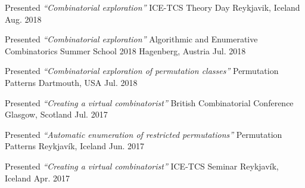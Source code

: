 


\begin{cventries}

\cventrypresentation
  {Presented \textit{``Combinatorial exploration''}} %
  {ICE-TCS Theory Day} %
  {Reykjavik, Iceland} %
  {Aug. 2018} %



\cventrypresentation
  {Presented \textit{``Combinatorial exploration''}} %
  {Algorithmic and Enumerative Combinatorics Summer School 2018} %
  {Hagenberg, Austria} %
  {Jul. 2018} %


\cventrypresentation
  {Presented \textit{``Combinatorial exploration of permutation classes''}} %
  {Permutation Patterns} %
  {Dartmouth, USA} %
  {Jul. 2018} %




\cventrypresentation
  {Presented \textit{``Creating a virtual combinatorist''}} %
  {British Combinatorial Conference} %
  {Glasgow, Scotland} %
  {Jul. 2017} %


\cventrypresentation
  {Presented \textit{``Automatic enumeration of restricted permutations''}} %
  {Permutation Patterns} %
  {Reykjavík, Iceland} %
  {Jun. 2017} %


\cventrypresentation
  {Presented \textit{``Creating a virtual combinatorist''}} %
  {ICE-TCS Seminar} %
  {Reykjavík, Iceland} %
  {Apr. 2017} %



\end{cventries}
